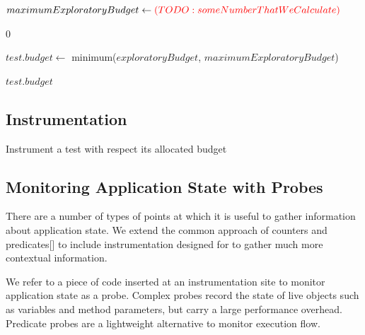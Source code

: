 {\begin{algorithm}[h]
\begin{algorithmic}[1]
	\State $maximumExploratoryBudget \gets {\color{red}(TODO: someNumberThatWeCalculate)}$

		\Return $0$
	\EndIf

	\State $test.budget \gets$ minimum($exploratoryBudget$,
	$maximumExploratoryBudget$)

	\State \Return $test.budget$

	\EndFunction
\end{algorithmic}

\end{algorithm}


\subsection{Instrumentation}


\begin{algorithm}[H]
\caption{Instrument a test with respect its allocated budget}
\label{alg:instrument}

\begin{algorithmic}
			\Else
			\EndIf
		\EndFor
	\EndWhile
\end{algorithmic}

\end{algorithm}


\subsection{Monitoring Application State with Probes}

There are a number of types of points at which it is useful to gather
information about application state. We extend the common approach of counters
and predicates[] to include instrumentation designed for to gather much more
contextual information.

We refer to a piece of code inserted at an instrumentation site to monitor
application state as a probe. Complex probes record the state of live objects
such as variables and method parameters, but carry a large performance overhead.
Predicate probes are a lightweight alternative to monitor execution flow.

}
